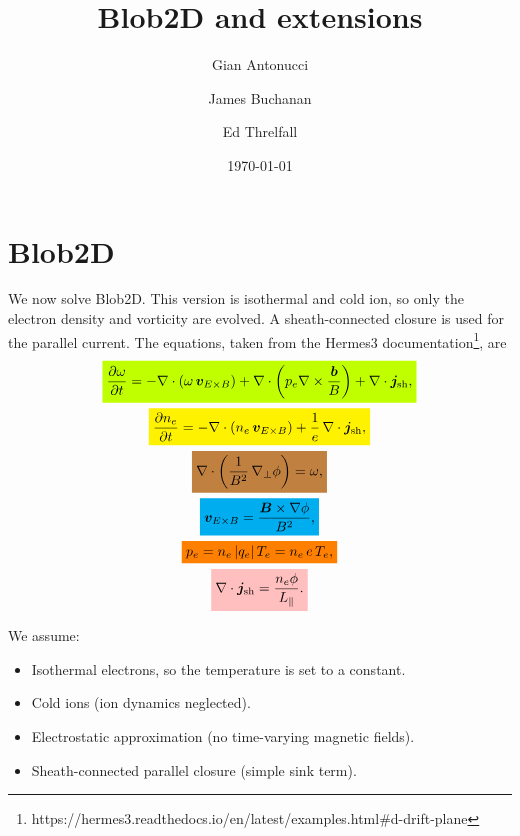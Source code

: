 \documentclass[12pt]{article}
\title{Blob2D and extensions}
\author{
    Gian Antonucci \and
    James Buchanan \and
    Ed Threlfall
}
\date{\today}
\newcommand{\mathcolorbox}[2]{\colorbox{#1}{$\displaystyle #2$}}
\begin{document}
\maketitle

\tableofcontents

\newpage

\section{Blob2D} \label{sec:blob2d}

We now solve Blob2D. This version is isothermal and cold ion, so only the electron density and vorticity are evolved. A sheath-connected closure is used for the parallel current. The equations, taken from the Hermes3 documentation\footnote{https://hermes3.readthedocs.io/en/latest/examples.html\#d-drift-plane}, are
%
\begin{gather}
    \mathcolorbox{lime}{ \frac{\partial\omega}{\partial t} = - \nabla \cdot (\omega \, \bm{v}_{E \times B}) + \nabla \cdot \left( p_e \nabla \times \frac{\bm{b}}{B} \right) + \nabla \cdot \bm{j}_\text{sh} , } \label{eq:vorticity} \\
    \mathcolorbox{yellow}{ \frac{\partial n_e}{\partial t} = - \nabla \cdot (n_e \, \bm{v}_{E \times B}) + \frac{1}{e} \, \nabla \cdot \bm{j}_\text{sh} , } \label{eq:density} \\
    \mathcolorbox{brown}{ \nabla \cdot \left( \frac{1}{B^2} \, \nabla_\perp \phi \right) = \omega , } \label{eq:potential} \\
    \mathcolorbox{cyan}{ \bm{v}_{E \times B} = \frac{\bm{B} \times \nabla \phi}{B^2} , } \label{eq:ExB_drift_fluid_velocity} \\
    \mathcolorbox{orange}{ p_e = n_e \, |q_e| \, T_e = n_e \, e \, T_e , } \label{eq:pressure} \\
    \mathcolorbox{pink}{ \nabla \cdot \bm{j}_\text{sh} = \frac{n_e \phi}{L_\parallel} . } \label{eq:sheath_closure}
\end{gather}

We assume:
%
\begin{itemize}
    \item Isothermal electrons, so the temperature is set to a constant.
    \item Cold ions (ion dynamics neglected).
    \item Electrostatic approximation (no time-varying magnetic fields).
    \item Sheath-connected parallel closure (simple sink term).
\end{itemize}
\end{document}
